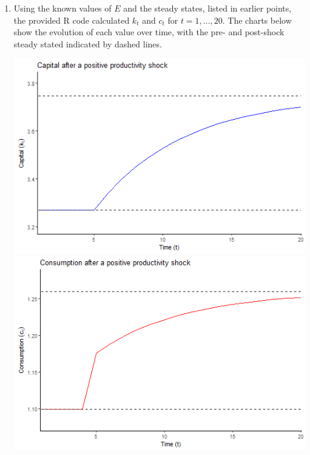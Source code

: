 \documentclass{article}
\begin{document}
\begin{enumerate}
\begin{enumerate}
			\item Using the known values of $E$ and the steady states, listed in earlier points, the provided R code calculated $k_t$ and $c_t$ for $t=1,...,20$. The charts below show the evolution of each value over time, with the pre- and post-shock steady stated indicated by dashed lines.
				\begin{center}
					\includegraphics[scale=.6]{problem1_timeplot_k.png}
					\includegraphics[scale=.6]{problem1_timeplot_c.png}
				\end{center}
				

\end{enumerate}
\end{enumerate}
\end{document}
